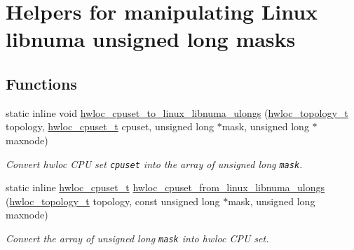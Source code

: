 \hypertarget{group__hwlocality__linux__libnuma__ulongs}{
\section{Helpers for manipulating Linux libnuma unsigned long masks}
\label{group__hwlocality__linux__libnuma__ulongs}
}
\subsection*{Functions}
\begin{CompactItemize}
\item 
static inline void \hyperlink{group__hwlocality__linux__libnuma__ulongs_g7119f03aa7437b027edea3a32ebce265}{hwloc\_\-cpuset\_\-to\_\-linux\_\-libnuma\_\-ulongs} (\hyperlink{group__hwlocality__topology_g9d1e76ee15a7dee158b786c30b6a6e38}{hwloc\_\-topology\_\-t} topology, \hyperlink{group__hwlocality__cpuset_g82e51d695c430832b703dad5ab8d75e4}{hwloc\_\-cpuset\_\-t} cpuset, unsigned long $\ast$mask, unsigned long $\ast$maxnode)
\begin{CompactList}\small\item\em Convert hwloc CPU set {\tt cpuset} into the array of unsigned long {\tt mask}. \item\end{CompactList}\item 
static inline \hyperlink{group__hwlocality__cpuset_g82e51d695c430832b703dad5ab8d75e4}{hwloc\_\-cpuset\_\-t} \hyperlink{group__hwlocality__linux__libnuma__ulongs_gad80d59fee26a1e0ecf7a0bae76dc685}{hwloc\_\-cpuset\_\-from\_\-linux\_\-libnuma\_\-ulongs} (\hyperlink{group__hwlocality__topology_g9d1e76ee15a7dee158b786c30b6a6e38}{hwloc\_\-topology\_\-t} topology, const unsigned long $\ast$mask, unsigned long maxnode)
\begin{CompactList}\small\item\em Convert the array of unsigned long {\tt mask} into hwloc CPU set. \item\end{CompactList}\end{CompactItemize}


